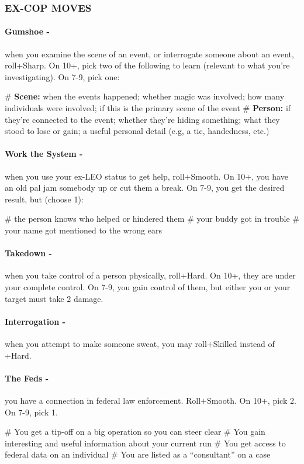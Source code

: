 \subsubsection{EX-COP MOVES}
\paragraph{Gumshoe -} when you examine the scene of an event, or interrogate someone about an event, roll+Sharp. On 10+, pick two of the following to learn (relevant to what you’re investigating). On 7-9, pick one:
    \begin{easylist}
        # \textbf{Scene:} when the events happened; whether magic was involved; how many individuals were involved; if this is the primary scene of the event
        # \textbf{Person:} if they’re connected to the event; whether they’re hiding something; what they stood to lose or gain; a useful personal detail (e.g, a tic, handedness, etc.)
    \end{easylist}

\paragraph{Work the System -} when you use your ex-LEO status to get help, roll+Smooth. On 10+, you have an old pal jam somebody up or cut them a break. On 7-9, you get the desired result, but (choose 1):
    \begin{easylist}
        # the person knows who helped or hindered them
        # your buddy got in trouble
        # your name got mentioned to the wrong ears        
    \end{easylist}

\paragraph{Takedown -} when you take control of a person physically, roll+Hard. On 10+, they are under your complete control. On 7-9, you gain control of them, but either you or your target must take 2 damage.

\paragraph{Interrogation -} when you attempt to make someone sweat, you may roll+Skilled instead of +Hard.

\paragraph{The Feds -} you have a connection in federal law enforcement. Roll+Smooth. On 10+, pick 2. On 7-9, pick 1.
    \begin{easylist}
        # You get a tip-off on a big operation so you can steer clear
        # You gain interesting and useful information about your current run
        # You get access to federal data on an individual
        # You are listed as a “consultant” on a case        
    \end{easylist}


